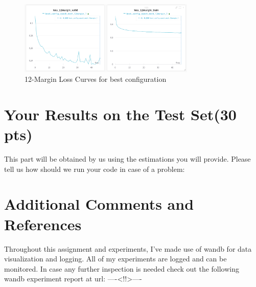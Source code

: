 \documentclass[12pt]{article}
\begin{document}
    \begin{figure}[!htb]
        \centering
        \includegraphics[width=0.75\textwidth]{figures/best_config_loss_12margin.png}
        \caption{12-Margin Loss Curves for best configuration}
        \label{fig:part-3_best_config_12margin_loss}
    \end{figure}

\section{Your Results on the Test Set(30 pts)}
This part will be obtained by us using the estimations you will provide. Please tell us how should we run your code in case of a problem:

\section{Additional Comments and References}

Throughout this assignment and experiments, I've made use of wandb for data visualization and logging.
All of my experiments are logged and can be monitored. In case any further inspection is needed check out the following wandb experiment report at url:
----<!!>----
\end{document}
